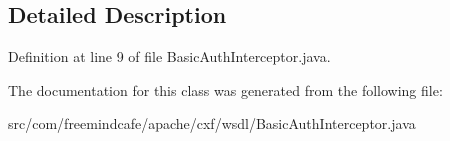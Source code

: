 \subsection{Detailed Description}


Definition at line 9 of file Basic\+Auth\+Interceptor.\+java.



The documentation for this class was generated from the following file\+:\begin{DoxyCompactItemize}
\item 
src/com/freemindcafe/apache/cxf/wsdl/Basic\+Auth\+Interceptor.\+java\end{DoxyCompactItemize}
